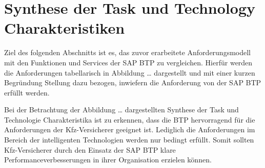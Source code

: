 \section{Synthese der Task und Technology Charakteristiken}

Ziel des folgenden Abschnitts ist es, das zuvor erarbeitete Anforderungsmodell mit den Funktionen und Services der SAP BTP zu vergleichen. Hierfür werden die Anforderungen tabellarisch in Abbildung … dargestellt und mit einer kurzen Begründung Stellung dazu bezogen, inwiefern die Anforderung von der SAP BTP erfüllt werden.
\newpage

Bei der Betrachtung der Abbildung … dargestellten Synthese der Task und Technologie Charakteristika ist zu erkennen, dass die BTP hervorragend für die Anforderungen der Kfz-Versicherer geeignet ist. Lediglich die Anforderungen im Bereich der intelligenten Technologien werden nur bedingt erfüllt. Somit sollten Kfz-Versicherer durch den Einsatz der SAP BTP klare Performanceverbesserungen in ihrer Organisation erzielen können.


\newpage